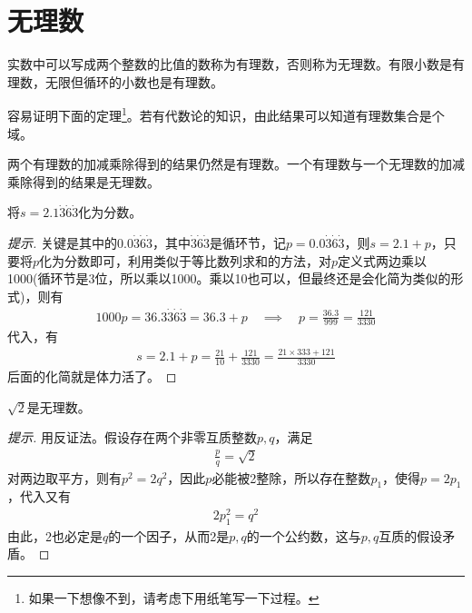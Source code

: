 \section{无理数}
\label{sec:irrational-numbers}

实数中可以写成两个整数的比值的数称为有理数，否则称为无理数。有限小数是有理数，无限但循环的小数也是有理数。

容易证明下面的定理\footnote{如果一下想像不到，请考虑下用纸笔写一下过程。}。若有代数论的知识，由此结果可以知道有理数集合是个域。

\begin{theorem}\label{th:rational-number-field}
  两个有理数的加减乘除得到的结果仍然是有理数。一个有理数与一个无理数的加减乘除得到的结果是无理数。
\end{theorem}

\begin{example}
  将$s=2.1\dot3\dot6\dot3$化为分数。
\end{example}
\begin{proof}[提示]
  关键是其中的$0.0\dot3\dot6\dot3$，其中$\dot3\dot6\dot3$是循环节，记$p=0.0\dot3\dot6\dot3$，则$s=2.1+p$，只要将$p$化为分数即可，利用类似于等比数列求和的方法，对$p$定义式两边乘以1000(循环节是3位，所以乘以1000。乘以10也可以，但最终还是会化简为类似的形式)，则有
  \begin{align*}
    1000p = 36.3\dot3\dot6\dot3 = 36.3 + p \quad\implies\quad p=\frac{36.3}{999}=\frac{121}{3330}
  \end{align*}
  代入，有
  \begin{align*}
    s=2.1+p = \frac{21}{10} + \frac{121}{3330} = \frac{21\times333 + 121}{3330}
  \end{align*}
  后面的化简就是体力活了。
\end{proof}


\begin{example}
  $\sqrt2$是无理数。
\end{example}
\begin{proof}[提示]
  用反证法。假设存在两个非零互质整数$p,q$，满足
  \begin{align*}
    \frac{p}{q}=\sqrt2
  \end{align*}
  对两边取平方，则有$p^2=2q^2$，因此$p$必能被2整除，所以存在整数$p_1$，使得$p=2p_1$，代入又有
  \begin{align*}
    2p_1^2=q^2
  \end{align*}
  由此，2也必定是$q$的一个因子，从而2是$p,q$的一个公约数，这与$p,q$互质的假设矛盾。
\end{proof}

